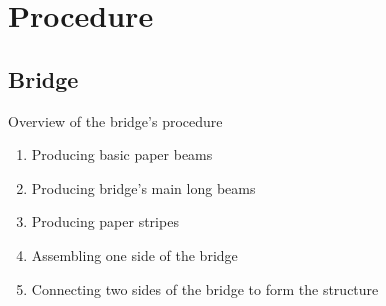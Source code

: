 \section{Procedure}
\subsection{Bridge}
Overview of the bridge’s procedure
\singlespacing
\begin{enumerate}
\item Producing basic paper beams 
\item Producing bridge’s main long beams
\item Producing paper stripes
\item Assembling one side of the bridge
\item Connecting two sides of the bridge to form the structure
\end{enumerate}

\bigskip
\doublespacing

